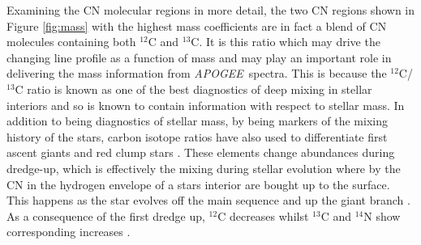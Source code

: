\documentclass[12pt, preprint]{aastex}
\newcommand{\project}[1]{\textsl{#1}}
\newcommand{\tc}{\project{The~Cannon}}
\newcommand{\apogee}{\project{APOGEE}}
\newcommand{\aspcap}{\project{ASPCAP}}
\begin{document}
Examining the CN molecular regions in more detail, the two CN regions shown in Figure \ref{fig:mass} with the highest mass coefficients are in fact a blend of CN molecules containing both $^{12}$C and $^{13}$C. It is this ratio which may drive the changing line profile as a function of mass and may play an important role in delivering the mass information from \apogee\ spectra. This is because the $^{12}$C/$^{13}$C ratio is known as one of the best diagnostics of deep mixing in stellar interiors and so is known to contain information with respect to stellar mass.  In addition to being diagnostics of stellar mass, by being markers of the mixing history of the stars, carbon isotope ratios have also used to differentiate first ascent giants and red clump stars \citep[see][and references therein]{Taut2013}. These elements change abundances during dredge-up, which is effectively the mixing during stellar evolution where by the CN in the hydrogen envelope of a stars interior are bought up to the surface. This happens as the star evolves off the main sequence and up the giant branch \citep{Gilroy1991}. As a consequence of the first dredge up, $^{12}$C decreases whilst $^{13}$C and $^{14}$N show corresponding increases \citep{Taut2010}. 

%
%


%
\end{document}
